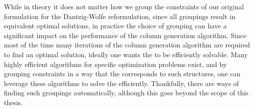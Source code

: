 While in theory it does not matter how we group the constraints of our original formulation \LP{} for the Dantzig-Wolfe reformulation, since all groupings result in equivalent optimal solutions, in practice the choice of grouping can have a significant impact on the performance of the column generation algorithm. Since most of the time many iterations of the column generation algorithm are required to find an optimal solution, ideally one wants the \SP{} to be efficiently solvable. Many highly efficient algorithms for specific optimization problems exist, and by grouping constraints in a way that the \SP{} corresponds to such structures, one can leverage these algorithms to solve the \SP{} efficiently. Thankfully, there are ways of finding such groupings automatically, although this goes beyond the scope of this thesis.
